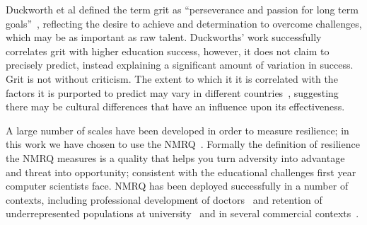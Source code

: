\documentclass[sigconf]{acmart}
\begin{document}
Duckworth et al defined the term grit as ``perseverance and passion for long term goals''~\cite{Duckworth2007}, reflecting the desire to achieve and determination to overcome challenges, which may be as important as raw talent. Duckworths' work successfully correlates grit with higher education success, however, it does not claim to precisely predict, instead explaining a significant amount of variation in success. Grit is not without criticism. The extent to which it it is correlated with the factors it is purported to predict may vary in different countries~\cite{Datu2016, Tyumeneva2017}, suggesting there may be cultural differences that have an influence upon its effectiveness. 

A large number of scales have been developed in order to measure resilience; in this work we have chosen to use the NMRQ~\cite{Clarke2010}. Formally the definition of resilience the NMRQ measures is a quality that helps you turn adversity into advantage and threat into opportunity; consistent with the educational challenges first year computer scientists face. NMRQ has been deployed successfully in a number of contexts, including professional development of doctors~\cite{Tregoningg251} and retention of underrepresented populations at university~\cite{Daniels2015} and in several commercial contexts~\cite{Clarke2010}. 

\end{document}
